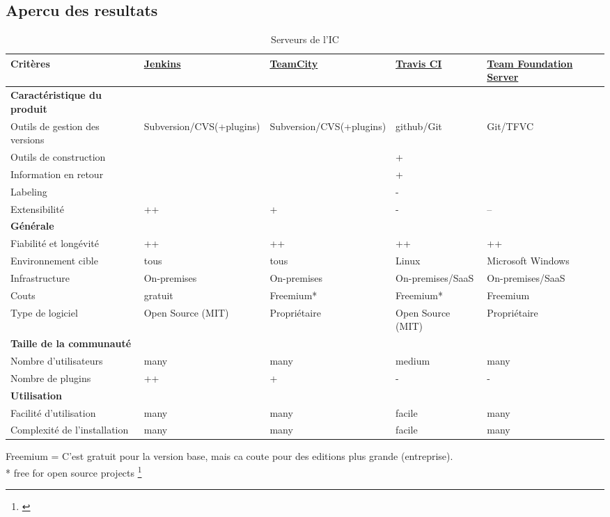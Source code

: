 \newpage
\begin{landscape}
\subsection{Apercu des resultats}
\begin{table}[H]
	\centering
		\begin{tabular}{lp{4cm}p{4cm}p{4cm}p{4cm}} \toprule
			\textbf{Critères} & \href{https://jenkins-ci.org}{\textbf{Jenkins}} & \href{https://www.jetbrains.com/teamcity/}{\textbf{TeamCity}} & \href{https://travis-ci.org}{\textbf{Travis CI}} & \href{https://www.visualstudio.com/en-us/products/tfs-overview-vs.aspx}{\textbf{Team Foundation Server}} \\ \midrule
			\rowcolor{GrayRow}\textbf{Caractéristique du produit} &  &  &  &  \\ \midrule[0.16em]
			Outils de gestion des versions & Subversion/CVS(+plugins) & Subversion/CVS(+plugins) & github/Git & Git/TFVC \\ \midrule
			Outils de construction & & & + & \\ \midrule
			Information en retour & & & + & \\ \midrule
			Labeling & & & - & \\ \midrule
			Extensibilité & ++ & + & - & -- \\ \midrule
			\rowcolor{GrayRow}\textbf{Générale} &  &  &  &  \\ \midrule[0.16em]
			Fiabilité et longévité & ++ & ++ & ++ & ++ \\ \midrule
			Environnement cible & tous & tous & Linux & Microsoft Windows \\ \midrule
			Infrastructure & On-premises & On-premises & On-premises/SaaS & On-premises/SaaS \\ \midrule
			Couts & gratuit & Freemium* & Freemium* & Freemium \\ \midrule
			Type de logiciel & Open Source (MIT) & Propriétaire & Open Source (MIT) & Propriétaire \\ \midrule
			\rowcolor{GrayRow}\textbf{Taille de la communauté} & & & & \\ \midrule[0.16em]
			Nombre d'utilisateurs & many & many & medium & many \\ \midrule
			Nombre de plugins & ++ & + & - & - \\ \midrule
			\rowcolor{GrayRow}\textbf{Utilisation} &  &  &  &  \\ \midrule[0.16em]
			Facilité d'utilisation & many & many & facile & many \\ \midrule
			Complexité de l'installation & many & many & facile & many \\
			\bottomrule[0.16em]
		\end{tabular}
	\caption{Serveurs de l'IC}
	\label{tab:serveurs_eval}
\end{table}
Freemium = C'est gratuit pour la version base, mais ca coute pour des editions plus grande (entreprise).\\
* free for open source projects
\footnote{\citep{jenkinsplugins} \citep{teamcityenv} \citep{tfsversioncontrol}}

\end{landscape}
\newpage

